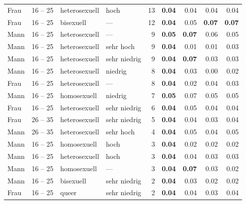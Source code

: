 \begin{ThreePartTable}
\begin{longtable}{llllr rrrr}
        Frau & 16 -- 25 & heterosexuell & hoch         & 13 & \textbf{0.04} & 0.04          & 0.04          & 0.04          \\
        Frau & 16 -- 25 & bisexuell     & ---          & 12 & \textbf{0.04} & 0.05          & \textbf{0.07} & \textbf{0.07} \\
        Mann & 16 -- 25 & heterosexuell & ---          &  9 & \textbf{0.05} & \textbf{0.07} & 0.06          & 0.05          \\
        Mann & 16 -- 25 & heterosexuell & sehr hoch    &  9 & \textbf{0.04} & 0.01          & 0.01          & 0.03          \\
        Mann & 16 -- 25 & heterosexuell & sehr niedrig &  9 & \textbf{0.04} & \textbf{0.07} & 0.03          & 0.03          \\
        Mann & 16 -- 25 & heterosexuell & niedrig      &  8 & \textbf{0.04} & 0.03          & 0.00          & 0.02          \\
        Frau & 16 -- 25 & heterosexuell & ---          &  8 & \textbf{0.04} & 0.02          & 0.04          & 0.03          \\
        Mann & 16 -- 25 & homosexuell   & niedrig      &  7 & \textbf{0.05} & 0.07          & 0.05          & 0.05          \\
        Frau & 16 -- 25 & heterosexuell & sehr niedrig &  6 & \textbf{0.04} & 0.05          & 0.04          & 0.04          \\
        Frau & 26 -- 35 & heterosexuell & sehr niedrig &  5 & \textbf{0.04} & 0.04          & 0.03          & 0.04          \\
        Mann & 26 -- 35 & heterosexuell & sehr hoch    &  4 & \textbf{0.04} & 0.05          & 0.04          & 0.05          \\
        Mann & 16 -- 25 & homosexuell   & hoch         &  3 & \textbf{0.04} & 0.02          & 0.02          & 0.02          \\
        Mann & 16 -- 25 & heterosexuell & hoch         &  3 & \textbf{0.04} & 0.04          & 0.03          & 0.03          \\
        Mann & 16 -- 25 & homosexuell   & ---          &  3 & \textbf{0.04} & \textbf{0.07} & 0.03          & 0.02          \\
        Mann & 16 -- 25 & bisexuell     & sehr niedrig &  2 & \textbf{0.04} & 0.03          & 0.02          & 0.02          \\
        Frau & 16 -- 25 & queer         & sehr niedrig &  2 & \textbf{0.04} & 0.04          & 0.03          & 0.04          \\
    
    \end{longtable}
\end{ThreePartTable}

